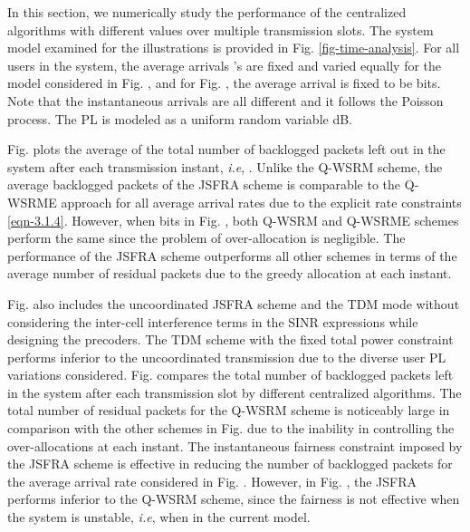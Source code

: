 In this section, we numerically study the performance of the centralized algorithms with different  values over multiple transmission slots. The system model examined for the illustrations is provided in Fig. \ref{fig-time-analysis}. For all users in the system, the average arrivals 's are fixed and varied equally for the model considered in Fig. , and for Fig. , the average arrival is fixed to be  bits. Note that the instantaneous arrivals  are all different and it follows the Poisson process. The \ac{PL} is modeled as a uniform random variable \me{[0,-6]} dB.

Fig.  plots the average of the total number of backlogged packets left out in the system after each transmission instant, \textit{i.e}, . Unlike the \ac{Q-WSRM} scheme, the average backlogged packets of the  \ac{JSFRA} scheme is comparable to the \ac{Q-WSRME} approach for all average arrival rates due to the explicit rate constraints \eqref{eqn-3.1.4}. However, when  bits in Fig. , both \ac{Q-WSRM} and \ac{Q-WSRME} schemes perform the same since the problem of over-allocation is negligible. The performance of the  \ac{JSFRA} scheme outperforms all other schemes in terms of the average number of residual packets due to the greedy allocation at each instant. 

Fig.  also includes the uncoordinated  \ac{JSFRA} scheme and the \ac{TDM} mode without considering the inter-cell interference terms in the \ac{SINR} expressions while designing the precoders. The \ac{TDM} scheme with the fixed total power constraint performs inferior to the uncoordinated transmission due to the diverse user \ac{PL} variations considered. Fig.  compares the total number of backlogged packets left in the system after each transmission slot by different centralized algorithms. The total number of residual packets for the \ac{Q-WSRM} scheme is noticeably large in comparison with the other schemes in Fig.  due to the inability in controlling the over-allocations at each instant. The instantaneous fairness constraint imposed by the \me{\ell_\infty} \ac{JSFRA} scheme is effective in reducing the number of backlogged packets for the average arrival rate considered in Fig. . However, in Fig. , the \me{\ell_\infty} \ac{JSFRA} performs inferior to the \ac{Q-WSRM} scheme, since the fairness is not effective when the system is unstable, \textit{i.e}, when  in the current model.
